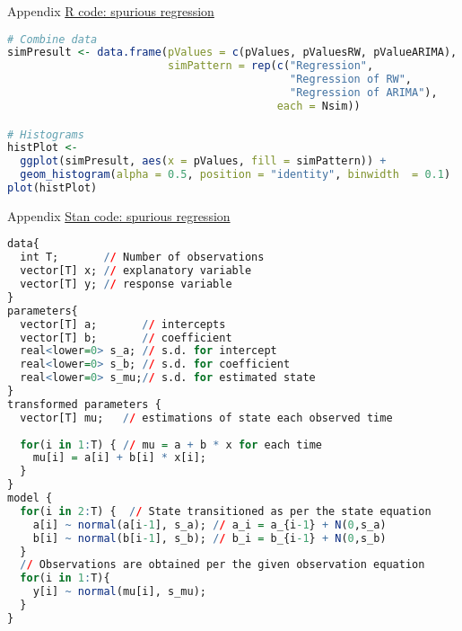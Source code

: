 \documentclass{beamer}\usepackage[]{graphicx}\usepackage[]{xcolor}
\begin{document}
\begin{frame}[fragile]{Appendix}
    \underline{R code: spurious regression}
    \fontsize{6pt}{6pt}\selectfont
    \begin{lstlisting}[language=R]
# Combine data 
simPresult <- data.frame(pValues = c(pValues, pValuesRW, pValueARIMA),
                         simPattern = rep(c("Regression", 
                                            "Regression of RW",
                                            "Regression of ARIMA"), 
                                          each = Nsim))

# Histograms
histPlot <- 
  ggplot(simPresult, aes(x = pValues, fill = simPattern)) + 
  geom_histogram(alpha = 0.5, position = "identity", binwidth  = 0.1)
plot(histPlot)
    \end{lstlisting}
\end{frame}

\begin{frame}[fragile]{Appendix}
    \underline{Stan code: spurious regression}
    \fontsize{6pt}{6pt}\selectfont
    \begin{lstlisting}[language=R]
data{
  int T;       // Number of observations
  vector[T] x; // explanatory variable
  vector[T] y; // response variable
}
parameters{
  vector[T] a;       // intercepts
  vector[T] b;       // coefficient
  real<lower=0> s_a; // s.d. for intercept
  real<lower=0> s_b; // s.d. for coefficient
  real<lower=0> s_mu;// s.d. for estimated state
}
transformed parameters {
  vector[T] mu;   // estimations of state each observed time
  
  for(i in 1:T) { // mu = a + b * x for each time
    mu[i] = a[i] + b[i] * x[i];
  }
}
model {
  for(i in 2:T) {  // State transitioned as per the state equation
    a[i] ~ normal(a[i-1], s_a); // a_i = a_{i-1} + N(0,s_a)
    b[i] ~ normal(b[i-1], s_b); // b_i = b_{i-1} + N(0,s_b)
  }
  // Observations are obtained per the given observation equation
  for(i in 1:T){
    y[i] ~ normal(mu[i], s_mu);
  }
}
    \end{lstlisting}
\end{frame}
\end{document}
